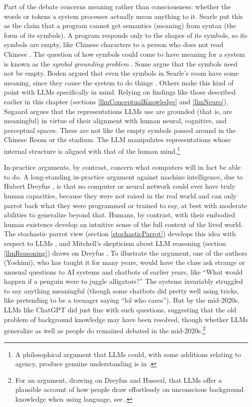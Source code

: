 Part of the debate concerns meaning rather than consciousness: whether the
words or tokens a system processes actually mean anything to it. Searle put
this as the claim that a program cannot get semantics (meaning) from syntax
(the form of its symbols). A program responds only to the shapes of its
symbols, so its symbols are empty, like Chinese characters to a person who
does not read Chinese \cite{searle1980minds}. The question of how symbols could
come to have meaning for a system is known as the \emph{symbol grounding
problem} \cite{harnad1990symbol}. Some argue that the symbols need not be
empty. Boden argued
that even the symbols in Searle's room have some meaning, since they cause the
system to do things \cite{boden1988escaping}. Others make this kind of point
with LLMs specifically in mind. Relying on findings like those described
earlier in this chapter (sections \ref{llmConceptualKnowledge} and
\ref{llmNeuro}), S{\o}gaard \cite{sogaard2023grounding} argues that the
representations LLMs use are grounded (that is, are meaningful) in virtue of
their alignment with human neural, cognitive, and perceptual spaces. These are
not like the empty symbols passed around in the Chinese Room or the stadium.
The LLM manipulates representations whose internal structure is aligned with
that of the human mind.\footnote{A philosophical argument that LLMs could, with
some additions relating to agency, produce genuine understanding is in
\cite{borg2025llms}.}

In-practice arguments, by contrast, concern what computers will in fact be
able to do. A long-standing in-practice argument
against machine intelligence, due to Hubert Dreyfus
\cite{dreyfus1992computers}, is that no computer or neural network could ever
have truly human capacities, because they were not raised in the real world and
can only parrot back what they were programmed or trained to say, at best with
moderate abilities to generalize beyond that. Humans, by contrast, with their
embodied human existence develop an intuitive sense of the full context of the
lived world. The stochastic parrot view (section \ref{stochasticParrot})
develops this idea with respect to LLMs \cite{bender2020climbing}, and
Mitchell's skepticism about LLM reasoning (section \ref{llmReasoning}) draws on
Dreyfus \cite{mitchell2021ai}. To illustrate the argument, one of the authors (Yoshimi), who
has taught it for many years, would have the class ask strange or unusual
questions to AI systems and chatbots of earlier years, like ``What would happen
if a penguin were to juggle alligators?'' The systems invariably struggled to
say anything meaningful (though some chatbots did pretty well using tricks,
like pretending to be a teenager saying ``lol who cares''). But by the
mid-2020s, LLMs like ChatGPT did just fine with such questions, suggesting
that the old problem of background knowledge may have been resolved, though
whether LLMs generalize as well as people do remained debated in the mid-2020s.\footnote{For
an argument, drawing on Dreyfus and Husserl, that LLMs offer a plausible
account of how people draw effortlessly on unconscious background knowledge
when using language, see \cite{yoshimi2026phenomenology}.}

